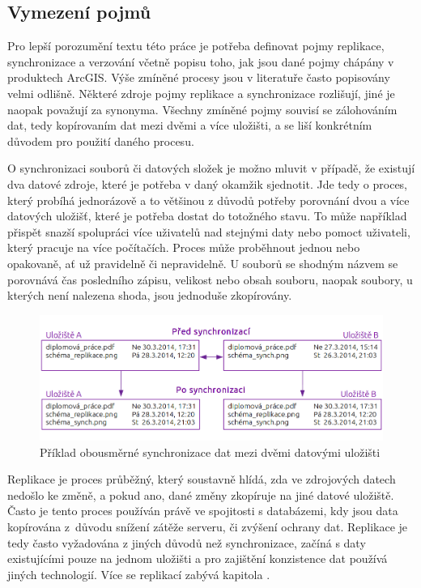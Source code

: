 \subsection{Vymezení pojmů}
\label{kVymezeniPojmu}

Pro lepší porozumění textu této práce je potřeba definovat pojmy replikace, synchronizace a verzování včetně popisu toho, jak jsou dané pojmy chápány v produktech ArcGIS. Výše zmíněné procesy jsou v literatuře často popisovány velmi odlišně. Některé zdroje pojmy replikace a synchronizace rozlišují, jiné je naopak považují za synonyma. Všechny zmíněné pojmy souvisí se zálohováním dat, tedy kopírovaním dat mezi dvěmi a více uložišti, a se liší konkrétním důvodem pro použití daného procesu. 

O synchronizaci souborů či datových složek je možno mluvit v případě, že existují dva datové zdroje, které je potřeba v daný okamžik sjednotit. Jde tedy o proces, který probíhá jednorázově a to většinou z důvodů potřeby porovnání dvou a více datových uložišť, které je potřeba dostat do totožného stavu. To může například přispět snazší spolupráci více uživatelů nad stejnými daty nebo pomoct uživateli, který pracuje na více počítačích. Proces může proběhnout jednou nebo opakovaně, ať už pravidelně či nepravidelně. U souborů se shodným názvem se porovnává čas posledního zápisu, velikost nebo obsah souboru, naopak soubory, u kterých není nalezena shoda, jsou jednoduše zkopírovány. 

          \begin{figure}[H]
            \centering
            \includegraphics[scale=1]{../../../grafy/obr/schema_synchronizace_maxiTence.png}
            \caption[Příklad obousměrné synchronizace dat]{Příklad obousměrné synchronizace dat mezi dvěmi datovými uložišti}
          \end{figure}

Replikace je proces průběžný, který soustavně hlídá, zda ve zdrojových datech nedošlo ke změně, a pokud ano, dané změny zkopíruje na jiné datové uložiště. Často je tento proces používán právě ve spojitosti s databázemi, kdy jsou data kopírována z~důvodu snížení zátěže serveru, či zvýšení ochrany dat. Replikace je tedy často vyžadována z jiných důvodů než synchronizace, začíná s daty existujícími pouze na jednom uložišti a pro zajištění konzistence dat používá jiných technologií. Více se replikací zabývá kapitola .

